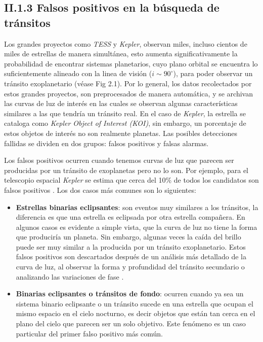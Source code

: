 \subsection*{II.1.3 Falsos positivos en la búsqueda de tránsitos}

Los grandes proyectos como \textit{TESS} y \textit{Kepler}, observan miles, incluso cientos de miles de estrellas de manera simultánea, esto aumenta significativamente la probabilidad de encontrar sistemas planetarios, cuyo plano orbital se encuentra lo suficientemente alineado con la linea de visión ($i\sim 90^{\circ}$), para poder observar un tránsito exoplanetario (véase Fig 2.1). Por lo general, los datos recolectados por estos grandes proyectos, son preprocesados de manera automática, y se archivan las curvas de luz de interés en las cuales se observan algunas características similares a las que tendría un tránsito real. En el caso de \textit{Kepler}, la estrella se cataloga como \textit{Kepler Object of Interest (KOI)}, sin embargo, un porcentaje de estos objetos de interés no son realmente planetas. Las posibles detecciones fallidas se dividen en dos grupos: falsos positivos y falsas alarmas.

Los falsos positivos ocurren cuando tenemos curvas de luz que parecen ser producidas por un tránsito de exoplanetas pero no lo son. Por ejemplo, para el telescopio espacial \textit{Kepler} se estima que cerca del 10\% de todos los candidatos son falsos positivos \citep{fressin2013false}. Los dos casos más comunes son lo siguientes:

\begin{itemize}
\item \textbf{Estrellas binarias eclipsantes}: son eventos muy similares a los tránsitos, la diferencia es que una estrella es eclipsada por otra estrella compañera. En algunos casos es evidente a simple vista, que la curva de luz no tiene la forma que produciría un planeta. Sin embargo, algunas veces la caída del brillo puede ser muy similar a la producida por un tránsito exoplanetario. Estos falsos positivos son descartados después de un análisis más detallado de la curva de luz, al observar la forma y profundidad del tránsito secundario o analizando las variaciones de fase \citep{bryson2017kepler}.
\item \textbf{Binarias eclipsantes o tránsitos de fondo}: ocurren cuando ya sea un sistema binario eclipsante o un tránsito sucede en una estrella que ocupan el mismo espacio en el cielo nocturno, es decir objetos que están tan cerca en el plano del cielo que parecen ser un solo objetivo. Este fenómeno es un caso particular del primer falso positivo más común.
\end{itemize}

